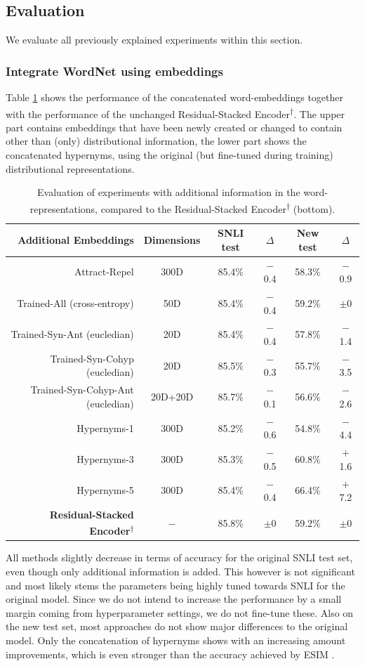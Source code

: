 \subsection{Evaluation}
We evaluate all previously explained experiments within this section.
\subsubsection{Integrate WordNet using embeddings}
Table \ref{tab:eval_embeddings_added} shows the performance of the concatenated word-embeddings together with the performance of the unchanged Residual-Stacked Encoder\textsuperscript{$\dagger$}. The upper part contains embeddings that have been newly created or changed to contain other than (only) distributional information, the lower part shows the concatenated hypernyms, using the original (but fine-tuned during training) distributional representations.
\begin{table}[tph!]
\centering
\begin{tabular}{rc|cc|cc}
\textbf{Additional Embeddings} &\textbf{Dimensions} & \textbf{\ac{SNLI} test} & \textbf{$\Delta$} & \textbf{New test} & \textbf{$\Delta$}\\
\toprule
Attract-Repel \citep{ruckle2018concatenated} & 300D & 85.4\% & $-$0.4 & 58.3\% & $-$0.9 \\
Trained-All (cross-entropy) & 50D & 85.4\% & $-$0.4 & 59.2\% & $\pm$0 \\
Trained-Syn-Ant (eucledian) & 20D & 85.4\% & $-$0.4 &57.8\% & $-$1.4 \\
Trained-Syn-Cohyp (eucledian)& 20D & 85.5\% & $-$0.3 &55.7\% & $-$3.5 \\
Trained-Syn-Cohyp-Ant (eucledian)& 20D+20D & 85.7\% & $-$0.1 & 56.6\% &  $-$2.6 \\
\midrule
Hypernyms-1 & 300D  & 85.2\% & $-$0.6 & 54.8\% & $-$4.4 \\
Hypernyms-3 & 300D  & 85.3\% & $-$0.5 & 60.8\% & $+$1.6 \\
Hypernyms-5 & 300D  & 85.4\% & $-$0.4 & 66.4\% & $+$7.2 \\
\midrule
\textbf{Residual-Stacked Encoder\textsuperscript{$\dagger$}} & $-$ & 85.8\% &$\pm$0 & 59.2\% & $\pm$0\\
\bottomrule
\end{tabular}
\caption{Evaluation of experiments with additional information in the word-representations, compared to the Residual-Stacked Encoder\textsuperscript{$\dagger$} (bottom).}
\label{tab:eval_embeddings_added}
\end{table}
All methods slightly decrease in terms of accuracy for the original \ac{SNLI} test set, even though only additional information is added. This however is not significant and most likely stems the parameters being highly tuned towards \ac{SNLI} for the original model. Since we do not intend to increase the performance by a small margin coming from hyperparameter settings, we do not fine-tune these. Also on the new test set, most approaches do not show major differences to the original model. Only the concatenation of hypernyms shows with an increasing amount improvements, which is even stronger than the accuracy achieved by \ac{ESIM} \citep{chen2017enhanced}. 
